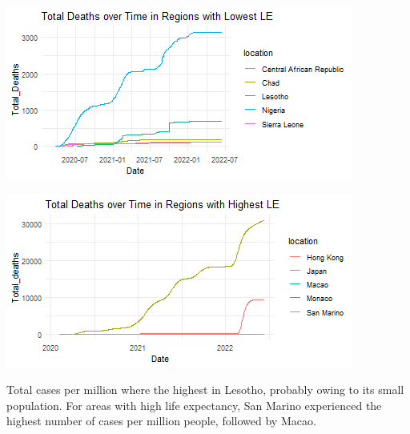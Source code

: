 \documentclass[11pt,preprint, authoryear]{elsarticle}
\let\origfigure\figure
\let\endorigfigure\endfigure
\renewenvironment{figure}[1][2] {
    \expandafter\origfigure\expandafter[H]
} {
    \endorigfigure
}
\numberwithin{equation}{section}
\numberwithin{figure}{section}
\numberwithin{table}{section}
\begin{document}
\begin{figure}[H]

{\centering \includegraphics{Q1_files/figure-latex/Figure2-1} 

}

\caption{Caption Here \label{Figure2}}\label{fig:Figure2-1}
\end{figure}
\begin{figure}[H]

{\centering \includegraphics{Q1_files/figure-latex/Figure2-2} 

}

\caption{Caption Here \label{Figure2}}\label{fig:Figure2-2}
\end{figure}

Total cases per million where the highest in Lesotho, probably owing to
its small population. For areas with high life expectancy, San Marino
experienced the highest number of cases per million people, followed by
Macao.
\end{document}
